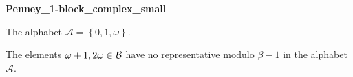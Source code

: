 \begin{exmp}
\textbf{ Penney\_1-block\_complex\_small }

\label{ex:Penney1-blockcomplexsmall}

The alphabet $\mathcal{A} =\left\{0, 1, \omega\right\}$.

The elements $\omega + 1, 2\omega \in\mathcal{B} $ have no representative  modulo $\beta-1$ in the alphabet $\mathcal{A}$.
\end{exmp}
